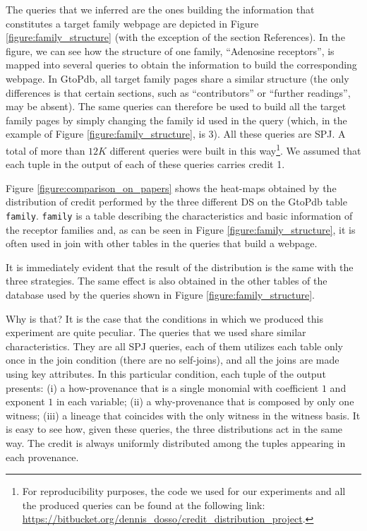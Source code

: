 The queries that we inferred are the ones building the information that constitutes a target family webpage are depicted in Figure \ref{figure:family_structure} (with the exception of the section References). 
In the figure, we can see how the structure of one family, ``Adenosine receptors'', is mapped into several queries to obtain the information to build the corresponding webpage. 
In GtoPdb, all target family pages share a similar structure (the only differences is that certain sections, such as ``contributors'' or ``further readings'', may be absent).
The same queries can therefore be used to build all the target family pages by simply changing the family id used in the query (which, in the example of Figure \ref{figure:family_structure}, is 3). All these queries are SPJ. 
A total of more than $12K$ different queries were built in this way\footnote{For reproducibility purposes, the code we used for our experiments and all the produced queries can be found at the following link: \url{https://bitbucket.org/dennis_dosso/credit_distribution_project}.}.
We assumed that each tuple in the output of each of these queries carries credit 1.

Figure \ref{figure:comparison_on_papers} shows the heat-maps obtained by the distribution of credit performed by the three different DS on the GtoPdb table \texttt{family}.
\texttt{family} is a table describing the characteristics and basic information of the receptor families and, as can be seen in Figure \ref{figure:family_structure}, it is often used in join with other tables in the queries that build a webpage.

It is immediately evident that the result of the distribution is the same with the three strategies. The same effect is also obtained in the other tables of the database used by the queries shown in Figure \ref{figure:family_structure}. 

Why is that? 
It is the case that the conditions in which we produced this experiment are quite peculiar. The queries that we used share similar characteristics. They are all SPJ queries, each of them utilizes each table only once in the join condition (there are no self-joins), and all the joins are made using key attributes. 
In this particular condition, each tuple of the output presents: (i) a how-provenance that is a single monomial with coefficient $1$ and exponent $1$ in each variable; (ii) a why-provenance that is composed by only one witness; (iii) a lineage that coincides with the only witness in the witness basis.
It is easy to see how, given these queries, the three distributions act in the same way.
The credit is always uniformly distributed among the tuples appearing in each provenance. 

